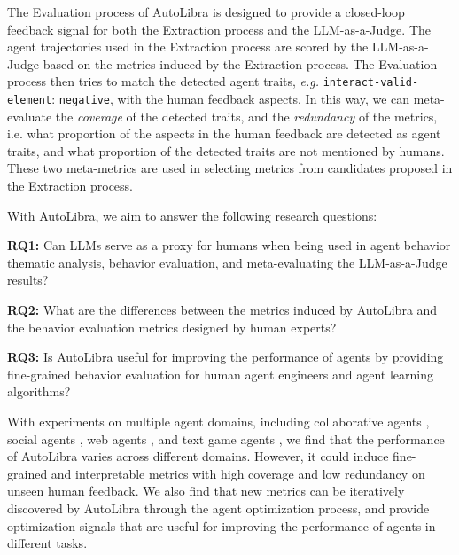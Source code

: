 The Evaluation process of AutoLibra is designed to provide a closed-loop feedback signal for both the Extraction process
and the LLM-as-a-Judge. The agent trajectories used in the Extraction process are scored by the LLM-as-a-Judge based
on the metrics induced by the Extraction process. The Evaluation process then tries to match the detected agent traits,
\emph{e.g.} \texttt{interact-valid-element}: \texttt{negative}, with the human feedback aspects.
In this way, we can meta-evaluate the \emph{coverage} of the detected traits, and the \emph{redundancy} of the metrics,
i.e. what proportion of the aspects in the human feedback are detected as agent traits,
and what proportion of the detected traits are not mentioned by humans. These two meta-metrics are used in selecting
metrics from candidates proposed in the Extraction process.



With AutoLibra, we aim to answer the following research questions:

\textbf{RQ1:} Can LLMs serve as a proxy for humans when being used in agent behavior thematic analysis,
    behavior evaluation, and meta-evaluating the LLM-as-a-Judge results?

\textbf{RQ2:}    What are the differences between the metrics induced by AutoLibra and the behavior evaluation
    metrics designed by human experts?

\textbf{RQ3:}  Is AutoLibra useful for improving the performance of agents by 
    providing fine-grained behavior evaluation for human agent engineers and agent learning algorithms?


With experiments on multiple agent domains, including collaborative agents \citep{shao2024collaborative}, social agents 
\citep{zhousotopia}, web agents \citep{zhouwebarena,he2024webvoyager}, and text game agents \citep{paglieri2024balrog,cloos2024babaaibreakrules}, 
we find that the performance of AutoLibra varies across different domains. 
However, it could induce fine-grained and interpretable metrics with high coverage and low redundancy on unseen human feedback.
We also find that new metrics can be iteratively discovered by AutoLibra through the agent optimization process,
and provide optimization signals that are useful for improving the performance of agents in different tasks.




